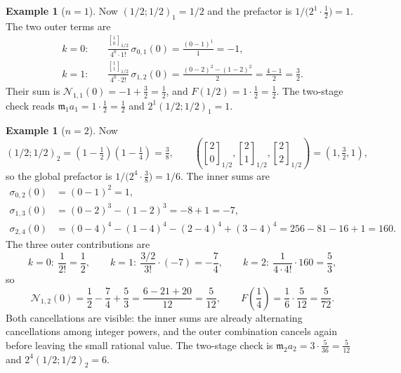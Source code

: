 \documentclass[11pt,oneside]{article}
\theoremstyle{definition}
\newtheorem{example}[theorem]{Example}
\theoremstyle{remark}
\newcommand{\qbinom}[3]{\genfrac{[}{]}{0pt}{}{#1}{#2}_{#3}}
\begin{document}
\begin{example}[$n=1$]
\label{ex:qs-n1}
Now $(1/2;1/2)_1=1/2$ and the prefactor is $1/\bigl(2^{1}\cdot\tfrac12\bigr)=1$.  The two
outer terms are
\begin{align*}
 k=0:&\quad \frac{\qbinom10{1/2}}{4^0\cdot1!}\,\sigma_{0,1}(0)
 =\frac{(0-1)^1}{1}=-1,\\
 k=1:&\quad \frac{\qbinom11{1/2}}{4^0\cdot2!}\,\sigma_{1,2}(0)
 =\frac{(0-2)^2-(1-2)^2}{2}=\frac{4-1}{2}=\frac32.
\end{align*}
Their sum is $\mathcal N_{1,1}(0)=-1+\tfrac32=\tfrac12$, and
$F(1/2)=1\cdot\tfrac12=\tfrac12$.  The two-stage check reads
$\mathfrak m_1a_1=1\cdot\tfrac12=\tfrac12$ and $2^{1}(1/2;1/2)_1=1$.
\end{example}

\begin{example}[$n=2$]
\label{ex:qs-n2}
Now
\begin{equation*}
 (1/2;1/2)_2=\left(1-\tfrac12\right)\left(1-\tfrac14\right)=\tfrac38,
 \qquad
 \left(\qbinom20{1/2},\qbinom21{1/2},\qbinom22{1/2}\right)=\left(1,\tfrac32,1\right),
\end{equation*}
so the global prefactor is $1/\bigl(2^{4}\cdot\tfrac38\bigr)=1/6$.  The inner sums are
\begin{align*}
 \sigma_{0,2}(0)&=(0-1)^2=1,\\
 \sigma_{1,3}(0)&=(0-2)^3-(1-2)^3=-8+1=-7,\\
 \sigma_{2,4}(0)&=(0-4)^4-(1-4)^4-(2-4)^4+(3-4)^4=256-81-16+1=160.
\end{align*}
The three outer contributions are
\begin{equation*}
 k=0:\ \frac{1}{2!}=\frac12,\qquad
 k=1:\ \frac{3/2}{3!}\cdot(-7)=-\frac74,\qquad
 k=2:\ \frac{1}{4\cdot4!}\cdot160=\frac53,
\end{equation*}
so
\begin{equation*}
 \mathcal N_{1,2}(0)=\frac12-\frac74+\frac53
 =\frac{6-21+20}{12}=\frac5{12},
 \qquad
 F\!\left(\frac14\right)=\frac16\cdot\frac5{12}=\frac5{72}.
\end{equation*}
Both cancellations are visible: the inner sums are already alternating cancellations among
integer powers, and the outer combination cancels again before leaving the small rational
value.  The two-stage check is $\mathfrak m_2a_2=3\cdot\tfrac5{36}=\tfrac5{12}$ and
$2^{4}(1/2;1/2)_2=6$.
\end{example}
\end{document}

